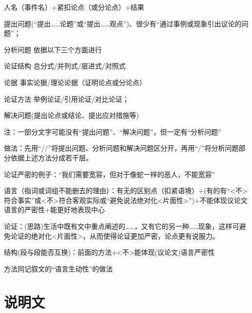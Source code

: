 人名（事件名）+紧扣论点（或分论点）+结果

\begin{asparaenum}[(1)]
\item 提出问题(``提出\ldots{}\ldots{}论题''或``提出\ldots{}\ldots{}观点'')、很少有``通过事例或现象引出议论的问题''；
\item 分析问题
依据以下三个方面进行
\begin{compactdesc}
\item[论证结构]总分式/并列式/层进式/对照式
\item[论据]事实论据/理论论据（证明论点或分论点）
\item[论证方法]举例论证/引用论证/对比论证；
\end{compactdesc}
\item 解决问题(提出论点或结论、提出应对措施等)
\end{asparaenum}
注：一部分文字可能没有``提出问题''、``解决问题''，但一定有``分析问题''\par
做法：先用``//''将提出问题、分析问题和解决问题区分开，再用``/''将分析问题部分依据上述方法分成若干层。

论证严密的例子：“我们需要宽容，但对于像蛇一样的恶人，不能宽容”
\begin{asparaenum}[(1)]
\item 语言（指词或词组不能删去的理由）：有无的区别点（扣紧语境）+(有的有``<不>符合事实''或<不>符合客观实际或``避免说法绝对化<片面性>'')+不能体现议论文语言的严密性+能更好地表现中心
\item 论证：(思路)生活中既有文中重点阐述的\ldots{}\ldots{}，又有它的另一种\ldots{}\ldots{}现象，这样可避免论证的绝对化\mbox{<片面性>}，从而使得论证更加严密，论点更有说服力。
\item 结构(段与段能否互换)：前面的方法+<不>能体现(议论文)语言严密性
\end{asparaenum}

  方法同记叙文的``语言生动性''的做法

\section{说明文}


